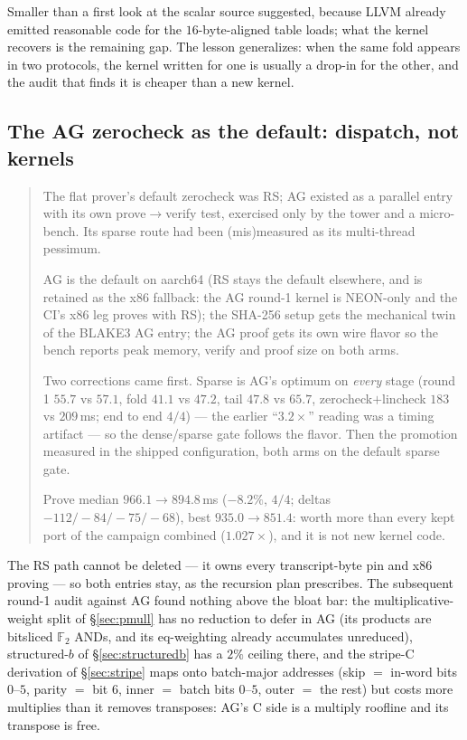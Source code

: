 \documentclass[11pt]{article}
\newcommand{\Ftwo}{\mathbb{F}_2}
\newenvironment{optsummary}{%
  \begin{quote}\small
  \begin{description}
  \setlength{\itemsep}{1pt}\setlength{\parsep}{0pt}\setlength{\topsep}{2pt}
}{%
  \end{description}
  \end{quote}
}
\begin{document}
Smaller than a first look at the scalar source suggested, because LLVM
already emitted reasonable code for the $16$-byte-aligned table loads;
what the kernel recovers is the remaining gap. The lesson generalizes:
when the same fold appears in two protocols, the kernel written for one
is usually a drop-in for the other, and the audit that finds it is
cheaper than a new kernel.

\subsection{The AG zerocheck as the default: dispatch, not kernels}\label{sec:agdefault}

\begin{optsummary}
\item[Baseline:] The flat prover's default zerocheck was RS; AG existed as a parallel entry with its own prove$\to$verify test, exercised only by the tower and a micro-bench. Its sparse route had been (mis)measured as its multi-thread pessimum.
\item[Improvement:] AG is the default on aarch64 (RS stays the default elsewhere, and is retained as the x86 fallback: the AG round-1 kernel is NEON-only and the CI's x86 leg proves with RS); the SHA-256 setup gets the mechanical twin of the BLAKE3 AG entry; the AG proof gets its own wire flavor so the bench reports peak memory, verify and proof size on both arms.
\item[Mechanism:] Two corrections came first. Sparse is AG's optimum on \emph{every} stage (round 1 $55.7$ vs $57.1$, fold $41.1$ vs $47.2$, tail $47.8$ vs $65.7$, zerocheck$+$lincheck $183$ vs $209\,$ms; end to end $4/4$) --- the earlier ``$3.2\times$'' reading was a timing artifact --- so the dense/sparse gate follows the flavor. Then the promotion measured in the shipped configuration, both arms on the default sparse gate.
\item[Result:] Prove median $966.1\to894.8\,$ms ($-8.2\%$, $4/4$; deltas $-112/-84/-75/-68$), best $935.0\to851.4$: worth more than every kept port of the campaign combined ($1.027\times$), and it is not new kernel code.
\end{optsummary}

The RS path cannot be deleted --- it owns every transcript-byte pin and
x86 proving --- so both entries stay, as the recursion plan prescribes.
The subsequent round-1 audit against AG found nothing above the bloat
bar: the multiplicative-weight split of \S\ref{sec:pmull} has no
reduction to defer in AG (its products are bitsliced $\Ftwo$ ANDs, and
its eq-weighting already accumulates unreduced), structured-$b$ of
\S\ref{sec:structuredb} has a $2\%$ ceiling there, and the stripe-C
derivation of \S\ref{sec:stripe} maps onto batch-major addresses
(skip $=$ in-word bits $0$--$5$, parity $=$ bit $6$, inner $=$ batch bits
$0$--$5$, outer $=$ the rest) but costs more multiplies than it removes
transposes: AG's C side is a multiply roofline and its transpose is free.
\end{document}
